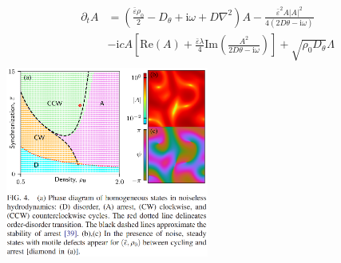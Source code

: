 \documentclass[10pt,aspectratio=43,mathserif,table]{beamer}
\begin{document}
\begin{frame}
    \begin{multicols}{2}
        {
        \tiny
            $$
            \begin{aligned}
                \partial _tA&=\left( \frac{\bar{\varepsilon}\rho _0}{2}-D_{\theta}+\mathrm{i}\omega +D\nabla ^2 \right) A-\frac{\bar{\varepsilon}^2A\left| A \right|^2}{4\left( 2D\theta -\mathrm{i}\omega \right)}\\
                &-\mathrm{i}cA\left[ \mathrm{Re}\left( A \right) +\frac{\bar{\varepsilon}\lambda}{4}\mathrm{Im}\left( \frac{A^2}{2D\theta -\mathrm{i}\omega} \right) \right] +\sqrt{\rho _0D_{\theta}}\Lambda\\
            \end{aligned}
            $$
        }
        \includegraphics[width=0.5\textwidth]{figs/p2_f4.png}
    \end{multicols}
\end{frame}

\end{document}
